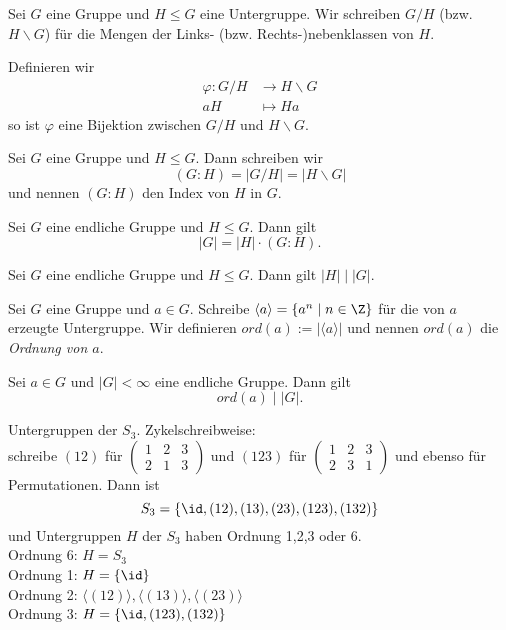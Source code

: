 \begin{defn*}
	Sei $G$ eine Gruppe und $H \leq G$ eine Untergruppe. Wir schreiben $G/H$ (bzw. $H\backslash G$) für die Mengen der Links- (bzw. Rechts-)nebenklassen von $H$.
\end{defn*}

\begin{rem*}
	Definieren wir
	\begin{align*}
		\varphi: G/H &\to H \backslash G\\
		aH &\mapsto Ha
	\end{align*}
	so ist $\varphi$ eine Bijektion zwischen $G/H$ und $ H \backslash G$.
\end{rem*}

\begin{defn*}[Index] 
	Sei $G$ eine Gruppe und $H \leq G$. Dann schreiben wir 
	\[ (G:H) = |G/H| = |H \backslash G| \]
	und nennen $(G:H)$ den Index von $H$ in $G$.
\end{defn*}

\begin{thm}
	Sei $G$ eine endliche Gruppe und $H \leq G$. Dann gilt 
	\[ |G| = |H| \cdot (G:H). \]
\end{thm}

\begin{cor}
	Sei $G$ eine endliche Gruppe und $H \leq G$. Dann gilt $ |H| \mid |G|. $
\end{cor}

\begin{defn*}[Ordnung]
	Sei $G$ eine Gruppe und $a \in G$. Schreibe $ \langle a \rangle = \{ a^n \mid n \in \Z \} $ für die von $a$ erzeugte Untergruppe. Wir definieren $ord(a) := |\langle a \rangle|$ und nennen $ord(a)$ die \emph{Ordnung von $a$}.
\end{defn*}

\begin{cor}
	Sei $a \in G$ und $|G| < \infty$ eine endliche Gruppe. Dann gilt
	\[ ord(a) \mid |G|. \]
\end{cor}

\begin{exmp*}
	Untergruppen der $S_3$. Zykelschreibweise:\\
	schreibe $(12)$ für $ \begin{pmatrix}
		1&2&3\\2&1&3
	\end{pmatrix} $ und $(123)$ für $ \begin{pmatrix}
		1&2&3\\2&3&1
	\end{pmatrix} $ und ebenso für Permutationen. Dann ist 
	\[ S_3 = \{\id, (12),(13),(23),(123),(132)\} \]
	und Untergruppen $H$ der $S_3$ haben Ordnung 1,2,3 oder 6.\\
	Ordnung 6: $H = S_3$\\
	Ordnung 1: $ H = \{\id\} $\\
	Ordnung 2: $ \langle (12) \rangle, \langle (13) \rangle, \langle(23)\rangle $\\
	Ordnung 3: $ H = \{\id,(123),(132)\} $
\end{exmp*}